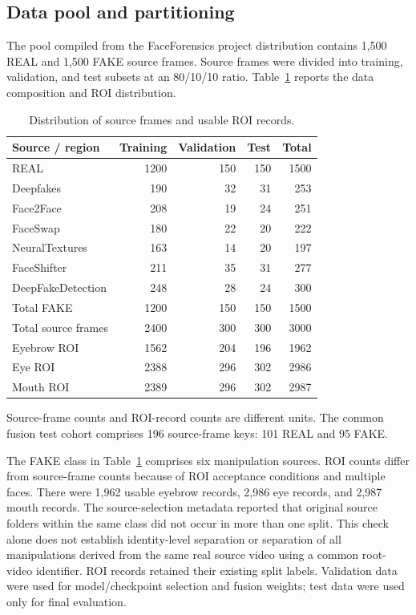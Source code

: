 \documentclass[a4paper]{elektr}
\begin{document}
\subsection{Data pool and partitioning}
The pool compiled from the FaceForensics project distribution contains 1,500 REAL and 1,500 FAKE source frames. Source frames were divided into training, validation, and test subsets at an 80/10/10 ratio. Table~\ref{tab:data} reports the data composition and ROI distribution.
\begin{table}[!htbp]\centering\begin{minipage}{15.8cm}
\caption{Distribution of source frames and usable ROI records.}\label{tab:data}
\centering \small
\begin{tabular}{lrrrr}\toprule
Source / region & Training & Validation & Test & Total \\\midrule
REAL & 1200 & 150 & 150 & 1500 \\
Deepfakes & 190 & 32 & 31 & 253 \\
Face2Face & 208 & 19 & 24 & 251 \\
FaceSwap & 180 & 22 & 20 & 222 \\
NeuralTextures & 163 & 14 & 20 & 197 \\
FaceShifter & 211 & 35 & 31 & 277 \\
DeepFakeDetection & 248 & 28 & 24 & 300 \\
Total FAKE & 1200 & 150 & 150 & 1500 \\
Total source frames & 2400 & 300 & 300 & 3000 \\
\midrule Eyebrow ROI & 1562 & 204 & 196 & 1962 \\
Eye ROI & 2388 & 296 & 302 & 2986 \\
Mouth ROI & 2389 & 296 & 302 & 2987 \\
\bottomrule\end{tabular}
\par\smallskip\begin{minipage}{\linewidth}\small Source-frame counts and ROI-record counts are different units. The common fusion test cohort comprises 196 source-frame keys: 101 REAL and 95 FAKE.\end{minipage}
\end{minipage}\end{table}

The FAKE class in Table~\ref{tab:data} comprises six manipulation sources. ROI counts differ from source-frame counts because of ROI acceptance conditions and multiple faces. There were 1,962 usable eyebrow records, 2,986 eye records, and 2,987 mouth records. The source-selection metadata reported that original source folders within the same class did not occur in more than one split. This check alone does not establish identity-level separation or separation of all manipulations derived from the same real source video using a common root-video identifier. ROI records retained their existing split labels. Validation data were used for model/checkpoint selection and fusion weights; test data were used only for final evaluation.
\end{document}
